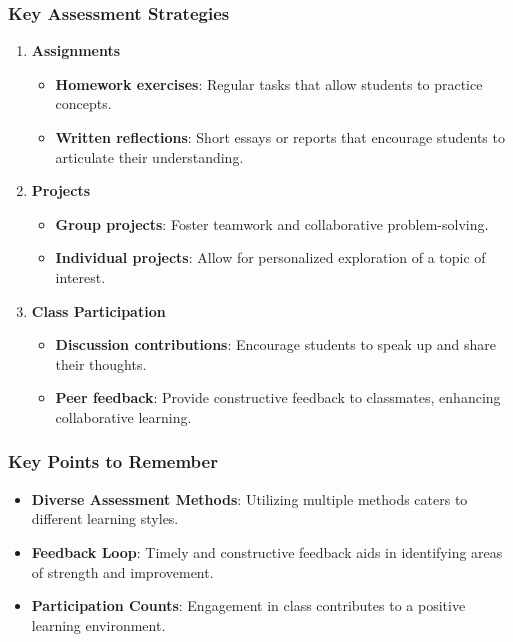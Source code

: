 \documentclass[aspectratio=169]{beamer}
\begin{document}
\begin{frame}[fragile]
    \frametitle{Key Assessment Strategies}
    \begin{enumerate}
        \item \textbf{Assignments}
        \begin{itemize}
            \item \textbf{Homework exercises}: Regular tasks that allow students to practice concepts.
            \item \textbf{Written reflections}: Short essays or reports that encourage students to articulate their understanding.
        \end{itemize}
        
        \item \textbf{Projects}
        \begin{itemize}
            \item \textbf{Group projects}: Foster teamwork and collaborative problem-solving.
            \item \textbf{Individual projects}: Allow for personalized exploration of a topic of interest.
        \end{itemize}
        
        \item \textbf{Class Participation}
        \begin{itemize}
            \item \textbf{Discussion contributions}: Encourage students to speak up and share their thoughts.
            \item \textbf{Peer feedback}: Provide constructive feedback to classmates, enhancing collaborative learning.
        \end{itemize}
    \end{enumerate}
\end{frame}

\begin{frame}[fragile]
    \frametitle{Key Points to Remember}
    \begin{itemize}
        \item \textbf{Diverse Assessment Methods}: Utilizing multiple methods caters to different learning styles.
        \item \textbf{Feedback Loop}: Timely and constructive feedback aids in identifying areas of strength and improvement.
        \item \textbf{Participation Counts}: Engagement in class contributes to a positive learning environment.
    \end{itemize}
\end{frame}
\end{document}

